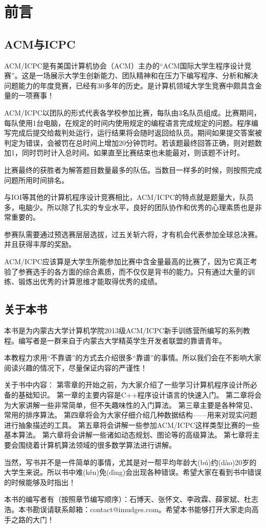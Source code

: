 \chapter*{前言}

\section*{ACM与ICPC}

ACM/ICPC是有美国计算机协会（ACM）主办的“ACM国际大学生程序设计竞赛”。这是一场展示大学生创新能力、团队精神和在压力下编写程序、分析和解决问题能力的年度竞赛，已经有30多年的历史。是计算机领域大学生竞赛中颇具含金量的一项赛事！

ACM/ICPC以团队的形式代表各学校参加比赛，每队由3名队员组成。比赛期间，每队使用1台电脑，在规定的时间内使用规定的编程语言完成规定的问题。程序编写完成后提交给裁判处运行，运行结果将会随时返回给队员。期间如果提交答案被判定为错误，会被罚在总时间上增加20分钟罚时。若该题最终回答正确，则对题数加1，同时罚时计入总时间。如果直至比赛结束也未能最对，则该题不计时。

比赛最终的获胜者为解答题目数量最多的队伍。当数目一样多的时候，则按照完成问题所用时间排名。

与IOI等其他的计算机程序设计竞赛相比，ACM/ICPC的特点就是题量大，队员多，电脑少。所以除了扎实的专业水平，良好的团队协作和优秀的心理素质也是非常重要的。

参赛队需要通过预选赛层层选拔，过五关斩六将，才有机会代表参加全球总决赛。并且获得丰厚的奖励。

ACM/ICPC应该算是大学生所能参加比赛中含金量最高的比赛了，因为它真正考验了参赛选手的各方面的综合素质，而不仅仅是背书的能力。只有通过大量的训练、锻炼出优秀的计算思维才能取得优秀的成绩。

\section*{关于本书}

本书是为内蒙古大学计算机学院2013级ACM/ICPC新手训练营所编写的系列教程。编写者是一群来自于内蒙古大学精英学生开发者联盟的靠谱青年。

本教程力求用“不靠谱”的方式去介绍很多“靠谱”的事情。所以我们会在不影响大家阅读兴趣的情况下，尽量保证内容的严谨性！

关于书中内容：
第零章的开始之前，为大家介绍了一些学习计算机程序设计所必备的基础知识。
第一章的主要内容是C++程序设计语言的快速入门。
第二章将会为大家讲解一些非常简单，但不失趣味性的入门算法。
第三章主要是各种常见、常用的排序算法。
第四章将会为大家仔细介绍几种数据结构——用来对现实问题进行抽象描述的工具。
第五章将会讲解一些参加ACM/ICPC这样类型比赛的一些基本算法。
第六章将会讲解一些诸如动态规划、图论等的高级算法。
第七章将主要会围绕着计算机算法领域的很多数学算法进行讲解。

当然，写书并不是一件简单的事情，尤其是对一帮平均年龄大(bú)约(dào)20岁的大学生来说。所以书中难(kěn)免(dìng)会出现各种错误。希望大家在看到书中错误的时候能够及时指出！

本书的编写者有（按照章节编写顺序）：石博天、张怀文、李政霖、薛家斌、杜志浩。本书勘误请联系邮箱：contact@imudges.com。希望本书能够打开大家走向高手之路的大门！ 
